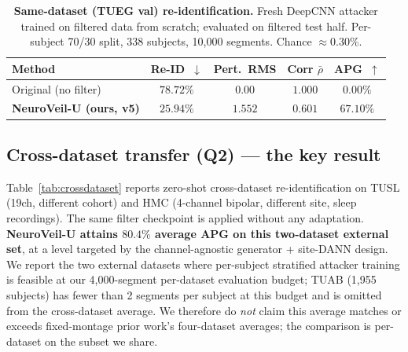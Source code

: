 \begin{table}[t]
\caption{\textbf{Same-dataset (TUEG val) re-identification.} Fresh DeepCNN attacker trained on filtered data from scratch; evaluated on filtered test half. Per-subject 70/30 split, 338 subjects, 10{,}000 segments. Chance $\approx\!0.30\%$.}
\label{tab:privacy_tueg}
\centering\small
\begin{tabular}{lcccc}
\toprule
\textbf{Method} & \textbf{Re-ID}~$\downarrow$ & \textbf{Pert.\ RMS} & \textbf{Corr $\bar\rho$} & \textbf{APG}~$\uparrow$ \\
\midrule
Original (no filter)            & $78.72\%$ & $0.00$ & $1.000$ & $0.00\%$ \\
\textbf{NeuroVeil-U (ours, v5)} & $\mathbf{25.94\%}$ & $1.552$ & $0.601$ & $\mathbf{67.10\%}$ \\
\bottomrule
\end{tabular}
\end{table}

\subsection{Cross-dataset transfer (Q2) --- the key result}
\label{sec:q2}

Table~\ref{tab:crossdataset} reports zero-shot cross-dataset re-identification on TUSL (19ch, different cohort) and HMC (4-channel bipolar, different site, sleep recordings). The same filter checkpoint is applied without any adaptation. \textbf{NeuroVeil-U attains $80.4\%$ average APG on this two-dataset external set}, at a level targeted by the channel-agnostic generator + site-DANN design. We report the two external datasets where per-subject stratified attacker training is feasible at our 4{,}000-segment per-dataset evaluation budget; TUAB (1{,}955 subjects) has fewer than 2 segments per subject at this budget and is omitted from the cross-dataset average. We therefore do \emph{not} claim this average matches or exceeds fixed-montage prior work's four-dataset averages; the comparison is per-dataset on the subset we share.

